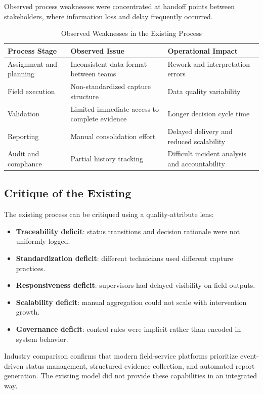 Observed process weaknesses were concentrated at handoff points between stakeholders, where information loss and delay frequently occurred.

\begin{table}[H]
\centering
\caption{Observed Weaknesses in the Existing Process}
\label{tab:existing_process_weaknesses}
\begin{tabularx}{\textwidth}{|l|X|X|}
\hline
\textbf{Process Stage} & \textbf{Observed Issue} & \textbf{Operational Impact} \\
\hline
Assignment and planning & Inconsistent data format between teams & Rework and interpretation errors \\
\hline
Field execution & Non-standardized capture structure & Data quality variability \\
\hline
Validation & Limited immediate access to complete evidence & Longer decision cycle time \\
\hline
Reporting & Manual consolidation effort & Delayed delivery and reduced scalability \\
\hline
Audit and compliance & Partial history tracking & Difficult incident analysis and accountability \\
\hline
\end{tabularx}
\end{table}

\subsection{Critique of the Existing}

The existing process can be critiqued using a quality-attribute lens:

\begin{itemize}
\item \textbf{Traceability deficit}: status transitions and decision rationale were not uniformly logged.
\item \textbf{Standardization deficit}: different technicians used different capture practices.
\item \textbf{Responsiveness deficit}: supervisors had delayed visibility on field outputs.
\item \textbf{Scalability deficit}: manual aggregation could not scale with intervention growth.
\item \textbf{Governance deficit}: control rules were implicit rather than encoded in system behavior.
\end{itemize}

Industry comparison confirms that modern field-service platforms prioritize event-driven status management, structured evidence collection, and automated report generation. The existing model did not provide these capabilities in an integrated way.

